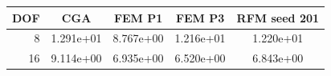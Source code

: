 \begin{tabular}{rcccc}
\toprule
DOF & CGA & FEM P1 & FEM P3 & RFM seed 201 \\
\midrule
8 & 1.291e+01 & 8.767e+00 & 1.216e+01 & 1.220e+01 \\
16 & 9.114e+00 & 6.935e+00 & 6.520e+00 & 6.843e+00 \\
\bottomrule
\end{tabular}
